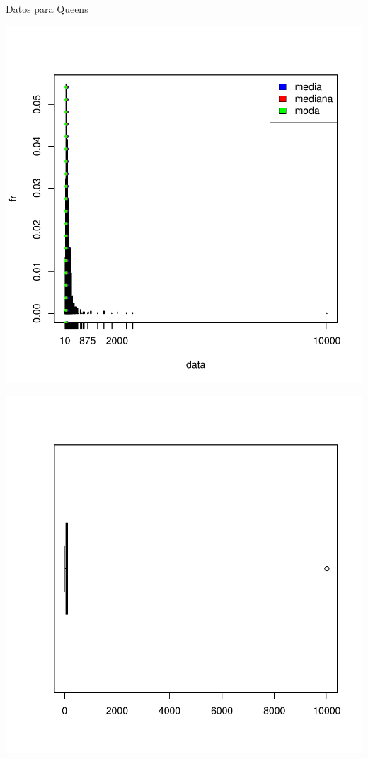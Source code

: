 \documentclass [a4paper] {article}
\begin{document}
Datos para Queens
\begin{center}
\includegraphics{entrega-035}
\end{center}
\begin{center}
\includegraphics{entrega-036}
\end{center}
\end{document}
